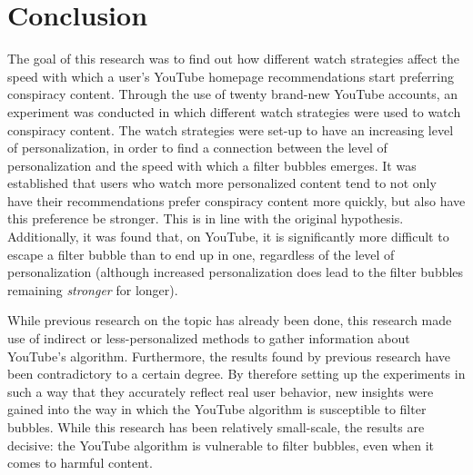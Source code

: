 \documentclass[../main.tex]{subfiles}
\begin{document}
\section{Conclusion}
The goal of this research was to find out how different watch strategies affect the speed with which a user's YouTube 
homepage recommendations start preferring conspiracy content. Through the use of twenty brand-new YouTube accounts, an 
experiment was conducted in which different watch strategies were used to watch conspiracy content. The watch strategies
were set-up to have an increasing level of personalization, in order to find a connection between the level of
personalization and the speed with which a filter bubbles emerges. It was established that users who watch more
personalized content tend to not only have their recommendations prefer conspiracy content more quickly, but also have
this preference be stronger. This is in line with the original hypothesis. Additionally, it was found that, on YouTube, it
is significantly more difficult to escape a filter bubble than to end up in one, regardless of the level of
personalization (although increased personalization does lead to the filter bubbles remaining \textit{stronger} for
longer).

While previous research on the topic has already been done, this research made use of indirect or less-personalized
methods to gather information about YouTube's algorithm. Furthermore, the results found by previous research have been
contradictory to a certain degree. By therefore setting up the experiments in such a way that they accurately reflect real
user behavior, new insights were gained into the way in which the YouTube algorithm is susceptible to filter bubbles.
While this research has been relatively small-scale, the results are decisive: the YouTube algorithm is vulnerable to filter bubbles, even when it comes to harmful content.  
\end{document}
